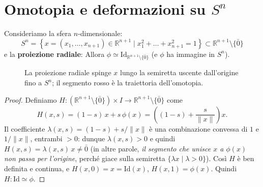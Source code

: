 \section{Omotopia e deformazioni su $S^n$}

\begin{ejemplo}
Consideriamo la sfera $n$-dimensionale:
\[S^n = \left\{ x = (x_1, \dots, x_{n+1}) \in \mathbb{R}^{n+1} \mid x_1^2 + \dots + x_{n+1}^2 = 1 \right\} \subset \mathbb{R}^{n+1} \setminus \{\bar{0}\}\]
e la \textbf{proiezione radiale}:
Allora $\phi \simeq \mathrm{Id}_{\mathbb{R}^{n+1} \setminus \{\bar{0}\}}$ (e $\phi$ ha immagine in $S^n$).

\begin{figure}[H]
    \centering
    \caption{La proiezione radiale spinge $x$ lungo la semiretta uscente dall'origine fino a $S^n$; il segmento rosso \`e la traiettoria dell'omotopia.}
\end{figure}
\end{ejemplo}

\begin{proof}
Definiamo $H: (\mathbb{R}^{n+1} \setminus \{\bar{0}\}) \times I \to \mathbb{R}^{n+1} \setminus \{\bar{0}\}$ come
\[
H(x,s) = (1-s)\,x + s\,\phi(x) = \left( (1-s) + \frac{s}{\|x\|} \right) x .
\]
Il coefficiente $\lambda(x,s) = (1-s) + s/\|x\|$ \`e una combinazione convessa di $1$ e $1/\|x\|$, entrambi $> 0$: dunque $\lambda(x,s) > 0$ e quindi $H(x,s) = \lambda(x,s)\,x \neq \bar{0}$ (in altre parole, \emph{il segmento che unisce $x$ a $\phi(x)$ non passa per l'origine}, perch\'e giace sulla semiretta $\{\lambda x \mid \lambda > 0\}$). Cos\`i $H$ \`e ben definita e continua, e
$H(x,0) = x = \mathrm{Id}(x)$, $H(x,1) = \phi(x)$. Quindi $H: \mathrm{Id} \simeq \phi$.
\end{proof}

